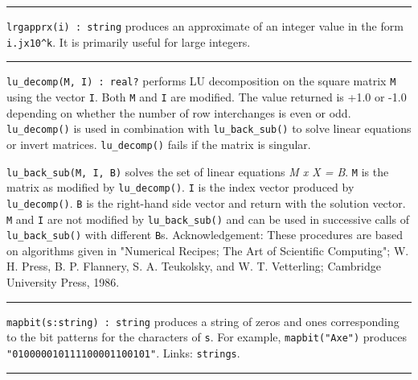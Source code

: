 \vspace{0.25cm}\hrule{}

\texttt{lrgapprx(i) : string} produces an approximate of an integer
value in the form \texttt{i.jx10\^{}k}. It is primarily useful for
large integers. 

\vspace{0.25cm}\hrule{}

\texttt{lu\_decomp(M, I) : real?} performs LU
decomposition on the square matrix \texttt{M} using the vector
\texttt{I}. Both \texttt{M} and \texttt{I} are modified. The value
returned is +1.0 or -1.0 depending on whether the number of row
interchanges is even or odd. \texttt{lu\_decomp()} is used in
combination with \texttt{lu\_back\_sub()} to solve linear equations or
invert matrices. \texttt{lu\_decomp()} fails if the matrix is singular.

\texttt{lu\_back\_sub(M, I, B)} solves the set of linear equations
\textit{M x X = B}. \texttt{M} is the matrix as modified by
\texttt{lu\_decomp()}. \texttt{I} is the index vector produced by
\texttt{lu\_decomp()}. \texttt{B} is the right-hand side vector and
return with the solution vector. \texttt{M} and \texttt{I} are not
modified by \texttt{lu\_back\_sub()} and can be used in successive
calls of \texttt{lu\_back\_sub()} with different \texttt{B}s.
Acknowledgement: These procedures are based on algorithms given in
"Numerical Recipes; The Art of Scientific
Computing"; W. H. Press, B. P. Flannery, S. A.
Teukolsky, and W. T. Vetterling; Cambridge University Press, 1986.


\vspace{0.25cm}\hrule{}

\texttt{mapbit(s:string) : string} produces a string of zeros and ones
corresponding to the bit patterns for the characters of \texttt{s}.
For example, \texttt{mapbit("Axe")} produces \linebreak
\texttt{"010000010111100001100101"}. Links:
\texttt{strings}. 

\vspace{0.25cm}\hrule{}

